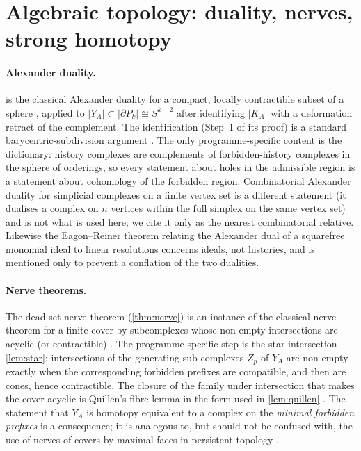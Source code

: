 \section{Algebraic topology: duality, nerves, strong homotopy}\label{sec:algtop}
\paragraph{Alexander duality.}  is the classical Alexander duality for a compact, locally contractible subset of a sphere \cite{Hatcher}, applied to $|Y_A|\subset|\partial P_k|\cong S^{k-2}$ after identifying $|K_A|$ with a deformation retract of the complement. The identification (Step~1 of its proof) is a standard barycentric-subdivision argument \cite{Munkres}. The only programme-specific content is the dictionary: history complexes are complements of forbidden-history complexes in the sphere of orderings, so every statement about holes in the admissible region is a statement about cohomology of the forbidden region. Combinatorial Alexander duality for simplicial complexes on a finite vertex set \cite{BjornerTancer} is a different statement (it dualises a complex on $n$ vertices within the full simplex on the same vertex set) and is not what is used here; we cite it only as the nearest combinatorial relative. Likewise the Eagon--Reiner theorem relating the Alexander dual of a squarefree monomial ideal to linear resolutions \cite{EagonReiner} concerns ideals, not histories, and is mentioned only to prevent a conflation of the two dualities.

\paragraph{Nerve theorems.} The dead-set nerve theorem (\cref{thm:nerve}) is an instance of the classical nerve theorem for a finite cover by subcomplexes whose non-empty intersections are acyclic (or contractible) \cite{Borsuk,Bjorner}. The programme-specific step is the star-intersection \cref{lem:star}: intersections of the generating sub-complexes $Z_p$ of $Y_A$ are non-empty exactly when the corresponding forbidden prefixes are compatible, and then are cones, hence contractible. The closure of the family under intersection that makes the cover acyclic is Quillen's fibre lemma in the form used in \cref{lem:quillen} \cite{Quillen}. The statement that $Y_A$ is homotopy equivalent to a complex on the \emph{minimal forbidden prefixes} is a consequence; it is analogous to, but should not be confused with, the use of nerves of covers by maximal faces in persistent topology \cite{Carlsson09}.

